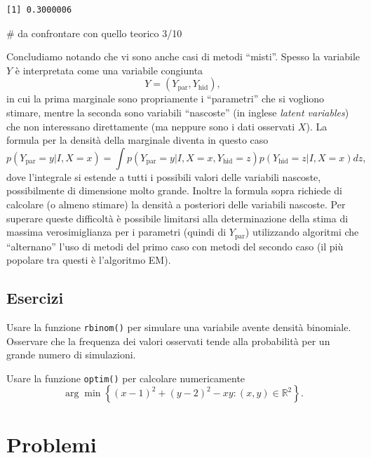 \documentclass[
  italian,
  letterpaper,
]{book}
\newenvironment{Shaded}{\begin{snugshade}}{\end{snugshade}}
\newcommand{\CommentTok}[1]{\textcolor[rgb]{0.37,0.37,0.37}{#1}}
\newcommand{\cur}[1]{\left\{ #1 \right\}}
\newcommand{\R}{\mathbb{R}}
\theoremstyle{definition}
\theoremstyle{remark}
\begin{document}
\begin{verbatim}
[1] 0.3000006
\end{verbatim}

\begin{Shaded}
\begin{Highlighting}[]
\CommentTok{\# da confrontare con quello teorico 3/10}
\end{Highlighting}
\end{Shaded}

Concludiamo notando che vi sono anche casi di metodi ``misti''. Spesso
la variabile \(Y\) è interpretata come una variabile congiunta
\[Y = (Y_{\operatorname{par}}, Y_{\operatorname{hid}}),\] in cui la
prima marginale sono propriamente i ``parametri'' che si vogliono
stimare, mentre la seconda sono variabili ``nascoste'' (in inglese
\emph{latent variables}) che non interessano direttamente (ma neppure
sono i dati osservati \(X\)). La formula per la densità della marginale
diventa in questo caso
\[ p(Y_{\operatorname{par}} = y | I, X=x)= \int p(Y_{\operatorname{par}} = y | I, X=x, Y_{\operatorname{hid}} =z) p(Y_{\operatorname{hid}} = z | I, X=x) dz,\]
dove l'integrale si estende a tutti i possibili valori delle variabili
nascoste, possibilmente di dimensione molto grande. Inoltre la formula
sopra richiede di calcolare (o almeno stimare) la densità a posteriori
delle variabili nascoste. Per superare queste difficoltà è possibile
limitarsi alla determinazione della stima di massima verosimiglianza per
i parametri (quindi di \(Y_{\operatorname{par}}\)) utilizzando algoritmi
che ``alternano'' l'uso di metodi del primo caso con metodi del secondo
caso (il più popolare tra questi è l'algoritmo EM).

\subsection{Esercizi}\label{esercizi-16}

Usare la funzione \texttt{rbinom()} per simulare una variabile avente
densità binomiale. Osservare che la frequenza dei valori osservati tende
alla probabilità per un grande numero di simulazioni.

Usare la funzione \texttt{optim()} per calcolare numericamente
\[ \arg \min \cur{ (x-1)^2 + (y-2)^2 - xy : (x,y ) \in \R^2}.\]

\section{Problemi}\label{problemi-1}
\end{document}
